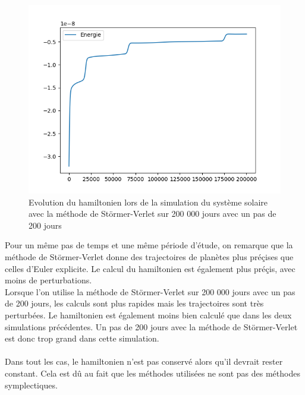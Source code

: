 \documentclass{article}
\begin{document}
\begin{figure}[!h]
\begin{center}
\includegraphics[scale=0.7]{Hamiltonien_stormer_verlet_200.png}
\caption{Evolution du hamiltonien lors de la simulation du système solaire avec la méthode de Störmer-Verlet sur 200 000 jours avec un pas de 200 jours}
\end{center}
\end{figure}
\newpage
\noindent
Pour un même pas de temps et une même période d'étude, on remarque que la méthode de Störmer-Verlet donne des trajectoires de planètes plus préçises que celles d'Euler explicite. Le calcul du hamiltonien est également plus préçis, avec moins de perturbations.\\
Lorsque l'on utilise la méthode de Störmer-Verlet sur 200 000 jours avec un pas de 200 jours, les calculs sont plus rapides mais les trajectoires sont très perturbées. Le hamiltonien est également moins bien calculé que dans les deux simulations précédentes. Un pas de 200 jours avec la méthode de Störmer-Verlet est donc trop grand dans cette simulation.\\
\\
Dans tout les cas, le hamiltonien n'est pas conservé alors qu'il devrait rester constant. Cela est dû au fait que les méthodes utilisées ne sont pas des méthodes symplectiques.
\end{document}
